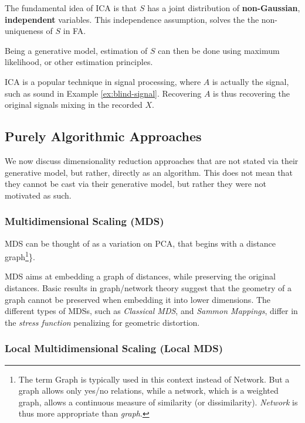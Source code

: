 \documentclass[]{book}
\theoremstyle{definition}
\theoremstyle{definition}
\theoremstyle{remark}
\begin{document}
The fundamental idea of ICA is that \(S\) has a joint distribution of
\textbf{non-Gaussian}, \textbf{independent} variables. This independence
assumption, solves the the non-uniqueness of \(S\) in FA.

Being a generative model, estimation of \(S\) can then be done using
maximum likelihood, or other estimation principles.

ICA is a popular technique in signal processing, where \(A\) is actually
the signal, such as sound in Example \ref{ex:blind-signal}. Recovering
\(A\) is thus recovering the original signals mixing in the recorded
\(X\).

\subsection{Purely Algorithmic
Approaches}\label{purely-algorithmic-approaches}

We now discuss dimensionality reduction approaches that are not stated
via their generative model, but rather, directly as an algorithm. This
does not mean that they cannot be cast via their generative model, but
rather they were not motivated as such.

\subsubsection{Multidimensional Scaling
(MDS)}\label{multidimensional-scaling-mds}

MDS can be thought of as a variation on PCA, that begins with a distance
graph\footnote{The term Graph is typically used in this context instead
  of Network. But a graph allows only yes/no relations, while a network,
  which is a weighted graph, allows a continuous measure of similarity
  (or dissimilarity). \emph{Network} is thus more appropriate than
  \emph{graph}.}\}.

MDS aims at embedding a graph of distances, while preserving the
original distances. Basic results in graph/network theory
\citep{graham1988isometric} suggest that the geometry of a graph cannot
be preserved when embedding it into lower dimensions. The different
types of MDSs, such as \emph{Classical MDS}, and \emph{Sammon Mappings},
differ in the \emph{stress function} penalizing for geometric
distortion.

\subsubsection{Local Multidimensional Scaling (Local
MDS)}\label{local-multidimensional-scaling-local-mds}
\end{document}
